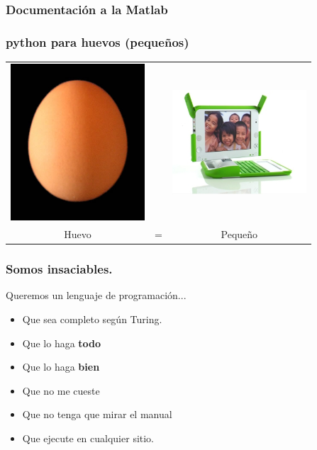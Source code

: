 \documentclass{beamer}
\begin{document}
\begin{frame}
\frametitle{Documentaci\'on a la Matlab}
\testcode
\end{frame}



\begin{frame}
 \frametitle{python para huevos (pequeños)}
  \begin{center}
 \begin{tabular}[h]{ccc}
   \includegraphics[width=5cm]{files/huevo.jpg} & &
   \includegraphics[width=5cm]{files/nigerian-machine.jpg}\\
   Huevo & = &Pequeño
 \end{tabular}
\end{center}
\end{frame}

\begin{frame}
  \frametitle{Somos insaciables.}
Queremos un lenguaje de programación...
  \begin{itemize}
  \item Que sea completo según Turing.
  \item Que lo haga \textbf{todo}
  \item Que lo haga \textbf{bien}
  \item Que no me cueste
  \item Que no tenga que mirar el manual
  \item Que ejecute en cualquier sitio.
  \end{itemize}
\end{frame}
\end{document}

